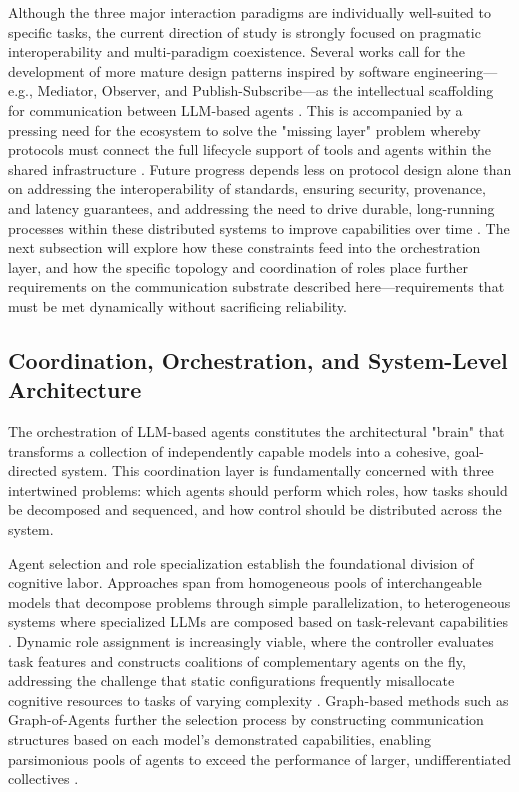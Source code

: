 \documentclass[11pt,a4paper]{article}
\begin{document}
Although the three major interaction paradigms are individually well-suited to specific tasks, the current direction of study is strongly focused on pragmatic interoperability and multi-paradigm coexistence. Several works call for the development of more mature design patterns inspired by software engineering---e.g., Mediator, Observer, and Publish-Subscribe---as the intellectual scaffolding for communication between LLM-based agents \cite{arxiv:2506.05364v2}. This is accompanied by a pressing need for the ecosystem to solve the "missing layer" problem whereby protocols must connect the full lifecycle support of tools and agents within the shared infrastructure \cite{arxiv:2506.12508v6}. Future progress depends less on protocol design alone than on addressing the interoperability of standards, ensuring security, provenance, and latency guarantees, and addressing the need to drive durable, long-running processes within these distributed systems to improve capabilities over time \cite{arxiv:2504.16736v3,arxiv:2507.10644v4}. The next subsection will explore how these constraints feed into the orchestration layer, and how the specific topology and coordination of roles place further requirements on the communication substrate described here---requirements that must be met dynamically without sacrificing reliability.


\subsection{Coordination, Orchestration, and System-Level Architecture}


The orchestration of LLM-based agents constitutes the architectural "brain" that transforms a collection of independently capable models into a cohesive, goal-directed system. This coordination layer is fundamentally concerned with three intertwined problems: which agents should perform which roles, how tasks should be decomposed and sequenced, and how control should be distributed across the system.

Agent selection and role specialization establish the foundational division of cognitive labor. Approaches span from homogeneous pools of interchangeable models that decompose problems through simple parallelization, to heterogeneous systems where specialized LLMs are composed based on task-relevant capabilities \cite{arxiv:2502.04506v1}. Dynamic role assignment is increasingly viable, where the controller evaluates task features and constructs coalitions of complementary agents on the fly, addressing the challenge that static configurations frequently misallocate cognitive resources to tasks of varying complexity \cite{arxiv:2411.14033v2}. Graph-based methods such as Graph-of-Agents further the selection process by constructing communication structures based on each model's demonstrated capabilities, enabling parsimonious pools of agents to exceed the performance of larger, undifferentiated collectives \cite{arxiv:2604.17148v1}.
\end{document}
